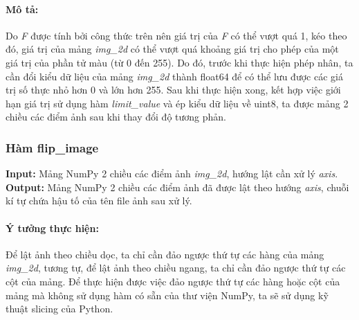 \documentclass[]{article}
\begin{document}
\paragraph{Mô tả:} Do \textit{F} được tính bởi công thức trên nên giá trị của \textit{F} có thể vượt quá 1, kéo theo đó, giá trị của mảng \textit{img\_2d} có thể vượt quá khoảng giá trị cho phép của một giá trị của phần tử màu (từ 0 đến 255). Do đó, trước khi thực hiện phép nhân, ta cần đổi kiểu dữ liệu của mảng \textit{img\_2d} thành float64 để có thể lưu được các giá trị số thực nhỏ hơn 0 và lớn hơn 255. Sau khi thực hiện xong, kết hợp việc giới hạn giá trị sử dụng hàm \textit{limit\_value} và ép kiểu dữ liệu về uint8, ta được mảng 2 chiều các điểm ảnh sau khi thay đổi độ tương phản.

\subsubsection{Hàm flip\_image}
\textbf{Input:} Mảng NumPy 2 chiều các điểm ảnh \textit{img\_2d}, hướng lật cần xử lý \textit{axis}. \\
\textbf{Output:} Mảng NumPy 2 chiều các điểm ảnh đã được lật theo hướng \textit{axis}, chuỗi kí tự chứa hậu tố của tên file ảnh sau xử lý.

\paragraph{Ý tưởng thực hiện:} Để lật ảnh theo chiều dọc, ta chỉ cần đảo ngược thứ tự các hàng của mảng \textit{img\_2d}, tương tự, để lật ảnh theo chiều ngang, ta chỉ cần đảo ngược thứ tự các cột của mảng. Để thực hiện được việc đảo ngược thứ tự các hàng hoặc cột của mảng mà không sử dụng hàm có sẵn của thư viện NumPy, ta sẽ sử dụng kỹ thuật slicing của Python.
\end{document}
